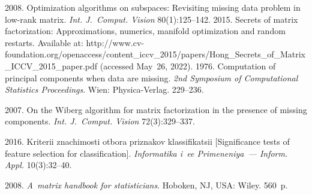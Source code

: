 







  \begin{multicols}{2}

\renewcommand{\bibname}{\protect\rmfamily References}

{\small\frenchspacing
 {%
 \begin{thebibliography}{9}
 2008. Optimization algorithms on subspaces: Revisiting missing data problem in 
low-rank matrix. \textit{Int. J.~Comput. Vision} 80(1):125--142.
 2015. Secrets of matrix factorization: Approximations, 
numerics, manifold optimization and random restarts. Available at: {\sf  
http://www.cv-\linebreak foundation.org/openaccess/content\_iccv\_2015/papers/\linebreak Hong\_Secrets\_of\_Matrix\_ICCV\_2015\_paper.pdf} (accessed 
May~26, 2022).
 1976. Computation of principal components when data are missing. \textit{2nd 
Symposium of Computational Statistics Proceedings}. Wien: Physica-Verlag. 229--236.

\vspace*{-1pt}

 2007. On the Wiberg algorithm for matrix factorization in the 
presence of missing components. \textit{Int. J.~Comput. Vision} 72(3):329--337.

\vspace*{-1pt}

 2016. Kriterii znachimosti otbora pri\-zna\-kov klassifikatsii [Significance 
tests of feature selection for classification]. \textit{Informatika i~ee Primeneniya~--- Inform. Appl.} 
10(3):32--40.

\vspace*{-1pt}

 2008. \textit{A~matrix handbook for statisticians}. Hoboken, NJ, USA: 
Wiley. 560~p.

\end{thebibliography}

 }
 }

\end{multicols}

